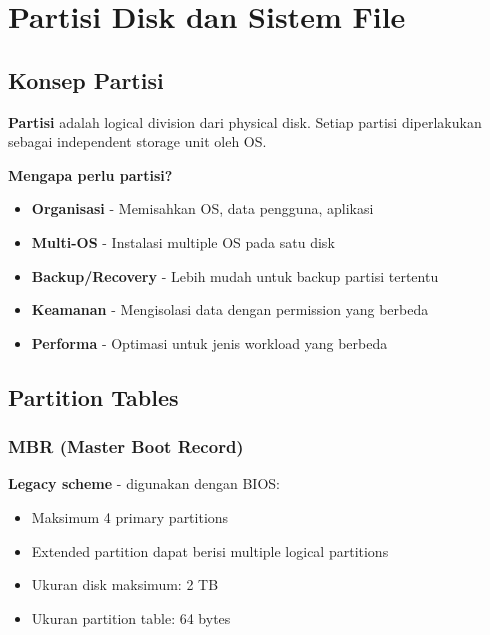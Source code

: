 
\section{Partisi Disk dan Sistem File}
\label{sec:disk-partitioning}

\subsection{Konsep Partisi}

\textbf{Partisi} adalah logical division dari physical disk. Setiap partisi diperlakukan sebagai independent storage unit oleh OS.

\textbf{Mengapa perlu partisi?}
\begin{itemize}
    \item \textbf{Organisasi} - Memisahkan OS, data pengguna, aplikasi
    \item \textbf{Multi-OS} - Instalasi multiple OS pada satu disk
    \item \textbf{Backup/Recovery} - Lebih mudah untuk backup partisi tertentu
    \item \textbf{Keamanan} - Mengisolasi data dengan permission yang berbeda
    \item \textbf{Performa} - Optimasi untuk jenis workload yang berbeda
\end{itemize}

\subsection{Partition Tables}

\subsubsection{MBR (Master Boot Record)}

\textbf{Legacy scheme} - digunakan dengan BIOS:
\begin{itemize}
    \item Maksimum 4 primary partitions
    \item Extended partition dapat berisi multiple logical partitions
    \item Ukuran disk maksimum: 2 TB
    \item Ukuran partition table: 64 bytes
\end{itemize}

